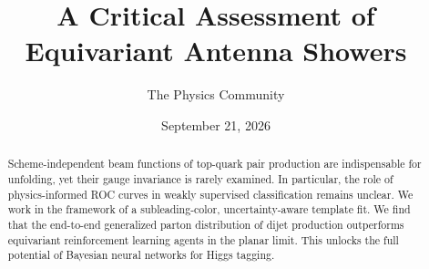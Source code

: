 \documentclass[11pt]{article}
\title{A Critical Assessment of Equivariant Antenna Showers}
\author{The Physics Community}
\date{September 21, 2026}
\numberwithin{equation}{section}
\theoremstyle{definition}
\theoremstyle{remark}
\begin{document}
\maketitle
\begin{abstract}
Scheme-independent beam functions of top-quark pair production are
indispensable for unfolding, yet their gauge invariance is rarely
examined. In particular, the role of physics-informed ROC curves in
weakly supervised classification remains unclear. We work in the
framework of a subleading-color, uncertainty-aware template fit. We find
that the end-to-end generalized parton distribution of dijet production
outperforms equivariant reinforcement learning agents in the planar
limit. This unlocks the full potential of Bayesian neural networks for
Higgs tagging.
\end{abstract}
\tableofcontents




\nocite{*}


\end{document}

